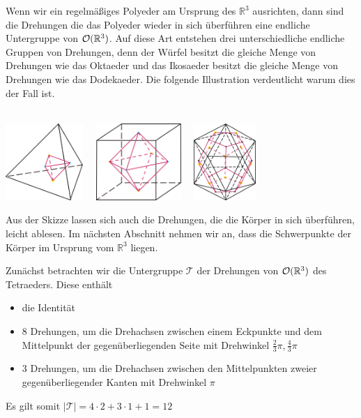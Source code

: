  Wenn wir ein regelmäßiges Polyeder am Ursprung des $\mathbb{R}^3$ ausrichten, dann sind die Drehungen die das Polyeder wieder in sich überführen eine endliche Untergruppe von ${\mathcal{O}(\mathbb{R}^3)}$. Auf diese Art entstehen drei unterschiedliche endliche Gruppen von Drehungen, denn der Würfel besitzt die gleiche Menge von Drehungen wie das Oktaeder und das Ikosaeder besitzt die gleiche Menge von Drehungen wie das Dodekaeder. Die folgende Illustration verdeutlicht warum dies der Fall ist.
 \\  \\
 \begin{center}
 \includegraphics[height=110px]{./Grafiken/Duality_Tetra-Tetra.png} \ \
 \includegraphics[height=110px]{./Grafiken/Duality_Hexa-Okta.png} \ \
 \includegraphics[height=110px]{./Grafiken/Duality_Iko-Dodek.png}
 \end{center}
 \newpage
Aus der Skizze lassen sich auch die Drehungen, die die Körper in sich überführen, leicht ablesen. Im nächsten Abschnitt nehmen wir an, dass die Schwerpunkte der Körper im Ursprung vom $\mathbb{R}^3$ liegen.

Zunächst betrachten wir die Untergruppe $\mathcal{T}$ der Drehungen von ${\mathcal{O}(\mathbb{R}^3)}$ des Tetraeders. Diese enthält
\begin{itemize}
  \item die Identität
  \item 8 Drehungen, um die Drehachsen zwischen einem Eckpunkte und dem Mittelpunkt der gegenüberliegenden Seite mit Drehwinkel $\frac{2}{3}\pi,\frac{4}{3}\pi$
  \item 3 Drehungen, um die Drehachsen zwischen den Mittelpunkten zweier gegenüberliegender Kanten mit Drehwinkel $\pi$
\end{itemize}
Es gilt somit $|\mathcal{T}|=4 \cdot 2 + 3 \cdot 1 +1 = 12$

